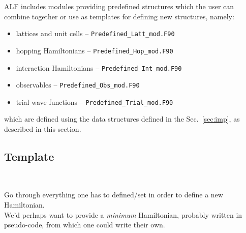 


ALF includes modules providing predefined structures which the user can combine together or use as templates for defining new structures, namely: 
\begin{itemize}
	\item lattices and unit cells -- \texttt{Predefined\_Latt\_mod.F90}
	\item hopping Hamiltonians -- \texttt{Predefined\_Hop\_mod.F90 }
	\item interaction Hamiltonians -- \texttt{Predefined\_Int\_mod.F90}
	\item observables -- \texttt{Predefined\_Obs\_mod.F90 }
	\item trial wave functions -- \texttt{Predefined\_Trial\_mod.F90 }
\end{itemize}
which are defined using the data structures defined in the Sec.~\ref{sec:imp}, as described in this section.












\subsection{Template}

\\
	

  Go through everything one has to defined/set in order to define a new Hamiltonian. \\

We'd perhaps want to provide a \emph{minimum} Hamiltonian, probably written in pseudo-code, from which one could write their own.\\ \\

